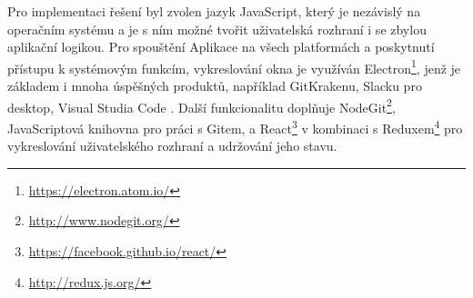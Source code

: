Pro implementaci řešení byl zvolen jazyk JavaScript, který je nezávislý na operačním systému a je s ním možné tvořit uživatelská rozhraní i se zbylou aplikační logikou. Pro spouštění Aplikace na všech platformách a poskytnutí přístupu k systémovým funkcím, vykreslování okna je využíván Electron\footnote{\url{https://electron.atom.io/}}, jenž je základem i mnoha úspěšných produktů, například GitKrakenu, Slacku pro desktop, Visual Studia Code \cite{electron-representative}. Další funkcionalitu doplňuje NodeGit\footnote{\url{http://www.nodegit.org/}}, JavaScriptová knihovna pro práci s Gitem, a React\footnote{\url{https://facebook.github.io/react/}} v kombinaci s Reduxem\footnote{\url{http://redux.js.org/}} pro vykreslování uživatelského rozhraní a udržování jeho stavu.